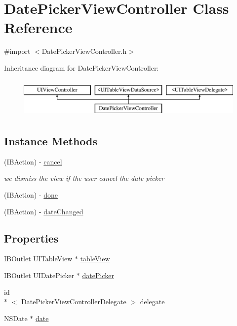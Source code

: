 \hypertarget{interface_date_picker_view_controller}{\section{Date\-Picker\-View\-Controller Class Reference}
\label{interface_date_picker_view_controller}
}


{\ttfamily \#import $<$Date\-Picker\-View\-Controller.\-h$>$}

Inheritance diagram for Date\-Picker\-View\-Controller\-:\begin{figure}[H]
\begin{center}
\leavevmode
\includegraphics[height=2.000000cm]{interface_date_picker_view_controller}
\end{center}
\end{figure}
\subsection*{Instance Methods}
\begin{DoxyCompactItemize}
\item 
(I\-B\-Action) -\/ \hyperlink{interface_date_picker_view_controller_a947795d6b5db9796faf52524dfad57ef}{cancel}
\begin{DoxyCompactList}\small\item\em we dismiss the view if the user cancel the date picker \end{DoxyCompactList}\item 
(I\-B\-Action) -\/ \hyperlink{interface_date_picker_view_controller_a59262bb1643d261557dd262d38c0dcbf}{done}
\item 
(I\-B\-Action) -\/ \hyperlink{interface_date_picker_view_controller_a3d220005a9eb904a320043bcef582798}{date\-Changed}
\end{DoxyCompactItemize}
\subsection*{Properties}
\begin{DoxyCompactItemize}
\item 
I\-B\-Outlet U\-I\-Table\-View $\ast$ \hyperlink{interface_date_picker_view_controller_a982400761463df927eb7af866537ece0}{table\-View}
\item 
I\-B\-Outlet U\-I\-Date\-Picker $\ast$ \hyperlink{interface_date_picker_view_controller_ad145f10f3b16d414b7af1324020ecfd5}{date\-Picker}
\item 
id\\*
$<$ \hyperlink{protocol_date_picker_view_controller_delegate-p}{Date\-Picker\-View\-Controller\-Delegate} $>$ \hyperlink{interface_date_picker_view_controller_a2e535fb7e3256251db35c4429ac5b32e}{delegate}
\item 
N\-S\-Date $\ast$ \hyperlink{interface_date_picker_view_controller_ae9db038d9affbbcb22dd7d0823c577d7}{date}
\end{DoxyCompactItemize}


